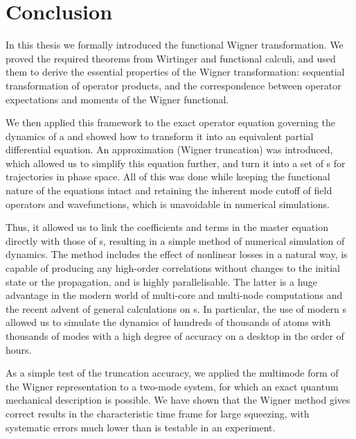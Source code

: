 \chapter{Conclusion}
\label{cha:conclusion}

In this thesis we formally introduced the functional Wigner transformation.
We proved the required theorems from Wirtinger and functional calculi, and used them to derive the essential properties of the Wigner transformation: sequential transformation of operator products, and the correspondence between operator expectations and moments of the Wigner functional.

We then applied this framework to the exact operator equation governing the dynamics of a  and showed how to transform it into an equivalent partial differential equation.
An approximation (Wigner truncation) was introduced, which allowed us to simplify this equation further, and turn it into a set of s for trajectories in phase space.
All of this was done while keeping the functional nature of the equations intact and retaining the inherent mode cutoff of field operators and wavefunctions, which is unavoidable in numerical simulations.

Thus, it allowed us to link the coefficients and terms in the master equation directly with those of s, resulting in a simple method of numerical simulation of  dynamics.
The method includes the effect of nonlinear losses in a natural way, is capable of producing any high-order correlations without changes to the initial state or the propagation, and is highly parallelisable.
The latter is a huge advantage in the modern world of multi-core and multi-node computations and the recent advent of general calculations on s.
In particular, the use of modern s allowed us to simulate the dynamics of hundreds of thousands of atoms with thousands of modes with a high degree of accuracy on a desktop in the order of hours.

As a simple test of the truncation accuracy, we applied the multimode form of the Wigner representation to a two-mode system, for which an exact quantum mechanical description is possible.
We have shown that the Wigner method gives correct results in the characteristic time frame for large squeezing, with systematic errors much lower than is testable in an experiment.

